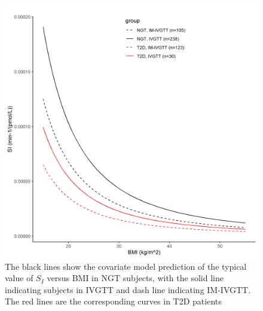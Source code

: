 \documentclass[utf8]{frontiersSCNS} %
\begin{document}
\begin{figure}[h!]
\begin{center}
\includegraphics[width=15cm]{SI_BMI.PNG}
\end{center}
\caption{The black lines show the covariate model prediction of the typical value of $S_I$ versus BMI in NGT subjects, with the solid line indicating subjects in IVGTT and dash line indicating IM-IVGTT. The red lines are the corresponding curves in T2D patients}
\label{fig: SI_BMI}
\end{figure}

\end{document}
